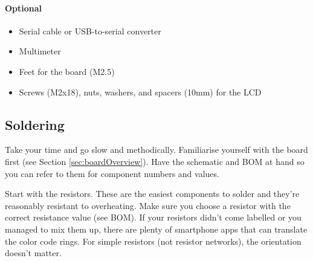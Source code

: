 \documentclass{article}
\begin{document}
\paragraph{Optional}
\begin{itemize}
\item[\CheckBox{}] Serial cable or USB-to-serial converter
\item[\CheckBox{}] Multimeter
\item[\CheckBox{}] Feet for the board (M2.5)
\item[\CheckBox{}] Screws (M2x18), nuts, washers, and spacers (10mm) for the LCD
\end{itemize}

\subsection{Soldering}
Take your time and go slow and methodically. Familiarise yourself with the board first (see Section \ref{sec:boardOverview}). Have the schematic and BOM at hand so you can refer to them for component numbers and values. 

Start with the resistors. These are the easiest components to solder and they're reasonably resistant to overheating. Make sure you choose a resistor with the correct resistance value (see BOM). If your resistors didn't come labelled or you managed to mix them up, there are plenty of smartphone apps that can translate the color code rings. For simple resistors (not resistor networks), the orientation doesn't matter. 
\end{document}
